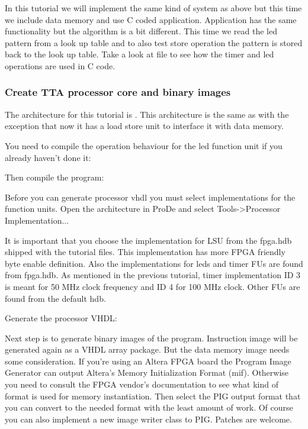 \documentclass[twoside]{tceusermanual}
\begin{document}
In this tutorial we will implement the same kind of system as above but this
time we include data memory and use C coded application. Application has
the same functionality but the algorithm is a bit different. This time we read the
led pattern from a look up table and to also test store operation the pattern
is stored back to the look up table. Take a look at file 
to see how the timer and led operations are used in C code.

\subsubsection{Create TTA processor core and binary images}

The architecture for this tutorial is . This architecture
is the same as  with the exception that now it has a load
store unit to interface it with data memory.

You need to compile the operation behaviour for the led function unit if you
already haven't done it:


Then compile the program:


Before you can generate processor vhdl you must select implementations for
the function units. Open the architecture in ProDe and select Tools->Processor
Implementation...


It is important that you choose the implementation for LSU from the fpga.hdb
shipped with the tutorial files. This implementation has more FPGA friendly
byte enable definition. Also the implementations for leds and timer FUs are
found from fpga.hdb. As mentioned in the previous tutorial, timer
implementation ID 3 is meant for 50 MHz clock frequency and ID 4 for 100 MHz
clock. Other FUs are found from the default hdb.


Generate the processor VHDL:


Next step is to generate binary images of the program. Instruction image will
be generated again as a VHDL array package. But the data memory image needs
some consideration. If you're using an Altera FPGA board the Program Image
Generator can output Altera's Memory Initialization Format (mif).
Otherwise you need to consult the FPGA vendor's documentation to see what kind
of format is used for memory instantiation. Then select the PIG output format
that you can convert to the needed format with the least amount of work. Of
course you can also implement a new image writer class to PIG. Patches are
welcome.
\end{document}
